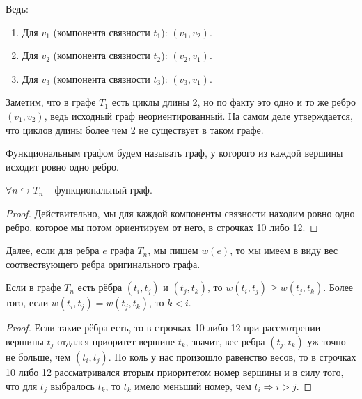 Ведь:
\begin{enumerate}
    \item Для $v_1$ (компонента связности $t_1$): $(v_1, v_2)$.
    \item Для $v_2$ (компонента связности $t_2$): $(v_2, v_1)$.
    \item Для $v_3$ (компонента связности $t_3$): $(v_3, v_1)$.
\end{enumerate}

\Note Заметим, что в графе $T_1$ есть циклы длины 2, но по факту это одно и то же ребро $(v_1, v_2)$, ведь исходный граф неориентированный. На самом деле утверждается, что циклов длины более чем 2 не существует в таком графе.

\Def Функциональным графом будем называть граф, у которого из каждой вершины исходит ровно одно ребро.

\St $\forall n \hookrightarrow \text{$T_n$ -- функциональный граф}$.
\begin{proof}
    
    Действительно, мы для каждой компоненты связности находим ровно одно ребро, которое мы потом ориентируем от него, в строчках 10 либо 12.

\end{proof}

Далее, если для ребра $e$ графа $T_n$, мы пишем $w(e)$, то мы имеем в виду вес соотвествующего ребра оригинального графа.

\St Если в графе $T_n$ есть рёбра $(t_i, t_j)$ и $(t_j, t_k)$, то $w(t_i, t_j) \geq w(t_j, t_k)$. Более того, если $w(t_i, t_j) = w(t_j, t_k)$, то $k < i$.
\begin{proof}
    
    Если такие рёбра есть, то в строчках 10 либо 12 при рассмотрении вершины $t_j$ отдался приоритет вершине $t_k$, значит, вес ребра $(t_j, t_k)$ уж точно не больше, чем $(t_i, t_j)$.
    Но коль у нас произошло равенство весов, то в строчках 10 либо 12 рассматривался вторым приоритетом номер вершины и в силу того, что для $t_j$ выбралось $t_k$, то $t_k$ имело меньший номер, чем $t_i \Rightarrow i > j$.

\end{proof}

